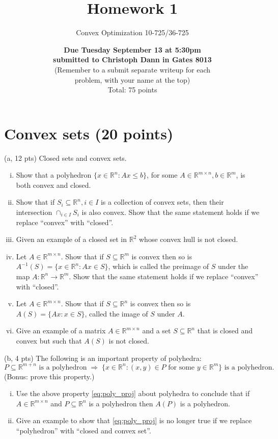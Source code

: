\documentclass{article}
\theoremstyle{remark}
\theoremstyle{definition}
\def\R{\mathbb{R}}
\begin{document}
\title{Homework 1}
\author{\Large Convex Optimization 10-725/36-725}
\date{{\bf Due Tuesday September 13 at 5:30pm \\
submitted to Christoph Dann in Gates 8013} \\
(Remember to a submit separate writeup for each \\ 
problem, with your name at the top) \\
\bigskip Total: 75 points}
\maketitle

\section{Convex sets (20 points)}

\noindent
(a, 12 pts) Closed sets and convex sets. 
\begin{enumerate}[i.]
\item Show that a polyhedron
  $\{x \in \mathbb{R}^n : Ax \leq b \}$, for some $A\in \R^{m\times 
    n},  b\in \R^m$, is both convex and closed. 
\item  Show that if $S_i \subseteq \R^n, i\in I$ is a collection of
  convex  sets, then their intersection $\cap_{i\in I} S_i$ is also
  convex.  Show that the same statement holds if we replace
  ``convex'' with ``closed''. 
\item Given an example of a closed set in $\R^2$ whose convex hull is
  not closed. 
\item  Let $A\in\R^{m\times n}$. Show that if $S\subseteq \R^m$ is
  convex then so is $A^{-1}(S) =\{ x \in \R^n : Ax
  \in S\}$, which is called the preimage of $S$ under the map $A :
  \R^n  \to \R^m$. Show that the same statement holds if we replace  
  ``convex'' with ``closed''.  
\item  Let $A\in\R^{m\times n}$.  Show that if $S\subseteq \R^n$ is 
  convex then so is $A(S) = \{ Ax : x \in S \}$, called the image of
  $S$ under $A$.
\item  Give an example of a matrix $A\in\R^{m\times n}$ and a set
  $S\subseteq \R^n$ that is closed and convex but such that $A(S)$ is
  not closed. 
\end{enumerate}

\bigskip
\noindent
(b, 4 pts) The following is an important property of polyhedra: 
\begin{equation}
\label{eq:poly_proj}
\text{$P \subseteq \R^{m+n}$ is a polyhedron} 
\; \Rightarrow \;
\text{$\{x\in \R^n : \text{$(x,y)\in P$ for some $y\in\R^m$}\}$ 
is a polyhedron}.
\end{equation}
(Bonus: prove this property.)
\begin{enumerate}[i.]
\item
Use the above property \eqref{eq:poly_proj} about polyhedra  to conclude 
that if $A\in \R^{m\times n}$ and $P\subseteq \R^n$ is a polyhedron
then $A(P)$ is a polyhedron.

\item Give an example to show that \eqref{eq:poly_proj}
  is no longer true if we replace ``polyhedron'' with ``closed and
  convex set''. 
\end{enumerate}
\end{document}
